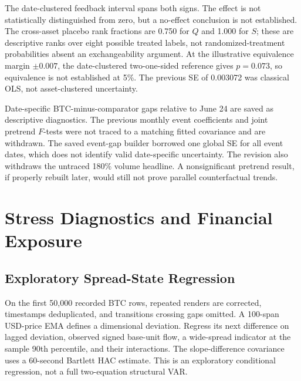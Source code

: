 \documentclass[12pt]{article}
\theoremstyle{definition}
\theoremstyle{remark}
\begin{document}
The date-clustered feedback interval spans both signs. The effect is not statistically distinguished from zero, but a no-effect conclusion is not established. The cross-asset placebo rank fractions are 0.750 for $Q$ and 1.000 for $S$; these are descriptive ranks over eight possible treated labels, not randomized-treatment probabilities absent an exchangeability argument. At the illustrative equivalence margin $\pm0.007$, the date-clustered two-one-sided reference gives $p=0.073$, so equivalence is not established at 5\%. The previous SE of 0.003072 was classical OLS, not asset-clustered uncertainty.

Date-specific BTC-minus-comparator gaps relative to June 24 are saved as descriptive diagnostics. The previous monthly event coefficients and joint pretrend $F$-tests were not traced to a matching fitted covariance and are withdrawn. The saved event-gap builder borrowed one global SE for all event dates, which does not identify valid date-specific uncertainty. The revision also withdraws the untraced 180\% volume headline. A nonsignificant pretrend result, if properly rebuilt later, would still not prove parallel counterfactual trends.

\section{Stress Diagnostics and Financial Exposure}
\label{sec:stress_fragility}
\subsection{Exploratory Spread-State Regression}
On the first 50,000 recorded BTC rows, repeated renders are corrected, timestamps deduplicated, and transitions crossing gaps omitted. A 100-span USD-price EMA defines a dimensional deviation. Regress its next difference on lagged deviation, observed signed base-unit flow, a wide-spread indicator at the sample 90th percentile, and their interactions. The slope-difference covariance uses a 60-second Bartlett HAC estimate. This is an exploratory conditional regression, not a full two-equation structural VAR.
\end{document}
